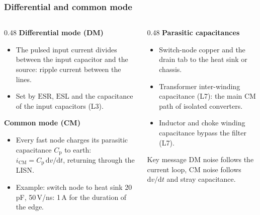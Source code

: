 \begin{frame}
	\frametitle{Differential and common mode}
	\begin{columns}[T]
		\begin{column}{0.48\textwidth}
			\small
			\textbf{Differential mode (DM)}
			\begin{itemize}
				\item The pulsed input current divides between the input capacitor and the source: ripple current between the lines.
				\item Set by $\mathrm{ESR}$, $\mathrm{ESL}$ and the capacitance of the input capacitors (L3).
			\end{itemize}
			\textbf{Common mode (CM)}
			\begin{itemize}
				\item Every fast node charges its parasitic capacitance $C_\mathrm{p}$ to earth: $i_\mathrm{CM}=C_\mathrm{p}\,\mathrm{d}v/\mathrm{d}t$, returning through the LISN.
				\item Example: switch node to heat sink 20\,pF, 50\,V/ns: 1\,A for the duration of the edge.
			\end{itemize}
		\end{column}
		\begin{column}{0.48\textwidth}
			\small
			\textbf{Parasitic capacitances}
			\begin{itemize}
				\item Switch-node copper and the drain tab to the heat sink or chassis.
				\item Transformer inter-winding capacitance (L7): the main CM path of isolated converters.
				\item Inductor and choke winding capacitance bypass the filter (L7).
			\end{itemize}
			\begin{block}{Key message}
				DM noise follows the current loop, CM noise follows $\mathrm{d}v/\mathrm{d}t$ and stray capacitance.
			\end{block}
		\end{column}
	\end{columns}
\end{frame}

